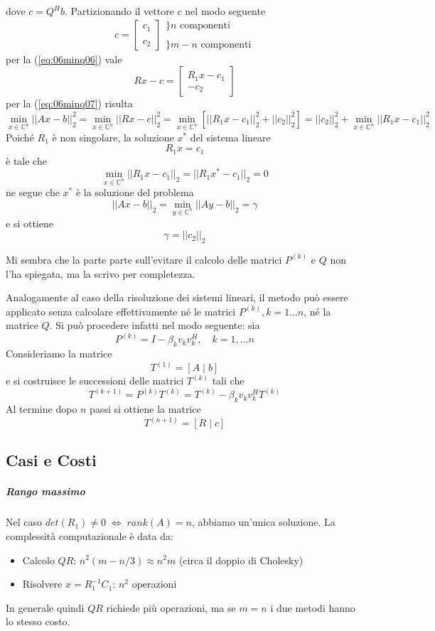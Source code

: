 dove $c = Q^H b$. Partizionando il vettore $c$ nel modo seguente
$$
  c = \left[
\begin{array}{l} c_1 \\ \\ c_2
\end{array} \right]
\begin{array}{l} \}n \text{ componenti} \\ \\ \}m-n \text{ componenti}
\end{array}
$$
per la (\ref{eq:06minq06}) vale
$$
Rx - c = \left[
\begin{array}{c} R_1 x -c_1 \\ -c_2
\end{array} \right]
$$
per la (\ref{eq:06minq07}) risulta
$$\min_{x \in \mathbb{C}^{n}}||Ax-b ||_{2}^{2}
= \min_{x \in \mathbb{C}^{n}}||Rx-c ||_{2}^{2} = \min_{x \in
\mathbb{C}^{n}}[||R_1x-c_1 ||_{2}^{2} + ||c_2||_2^2] = ||c_2||_2^2 +
\min_{x \in \mathbb{C}^{n}} ||R_1x - c_1 ||_{2}^{2}
 $$
Poich\'e $R_1$ \`e non singolare, la soluzione $x^{*}$ del sistema
lineare
\begin{equation}
 \label{eq:06minq08} R_1x = c_1
\end{equation} \`e tale che
$$
\min_{x \in \mathbb{C}^{n}} ||R_1 x - c_1||_2 = ||R_1 x^{*} -c_1||_2 =
0
$$
ne segue che $x^*$ \`e la soluzione del problema
$$|| Ax − b ||_{2} = \displaystyle \min_{y \in
\mathbb{C}^{n}} || Ay − b||_{2} = \gamma$$ e si ottiene
$$\gamma = ||c_2||_2$$

\begin{notes} Mi sembra che la parte parte sull'evitare il calcolo
delle matrici $P^{(k)}$ e $Q$ non l'ha spiegata, ma la scrivo per
completezza.
\end{notes} Analogamente al caso della risoluzione dei sistemi
lineari, il metodo pu\`o essere applicato senza calcolare
effettivamente n\'e le matrici $P^{(k)}, k =1\ldots n$, n\'e la
matrice $Q$.  Si pu\`o procedere infatti nel modo seguente: sia
$$P^{(k)} = I - \beta_{k} v_k v_k^{H}, \quad
k=1, \ldots n$$ Consideriamo la matrice
$$T^{(1)} = [A \; | \; b]$$
e si costruisce le successioni delle matrici $T^{(k)}$ tali che
$$
T^{(k+1)} = P^{(k)}T^{(k)} = T^{(k)} - \beta_k v_k v_k^{H} T^{(k)}
$$
Al termine dopo $n$ passi si ottiene la matrice
$$ T^{(n+1)} = [R \; | \; c ] $$

\subsection{Casi e Costi} \subparagraph{Rango massimo} Nel caso
$det(R_1) \neq 0 \; \Longleftrightarrow \; rank(A) =n$, abbiamo
un'unica soluzione. La complessit\`a computazionale \`e data da:
\begin{itemize}
 \item Calcolo $QR$: $n^{2}(m-n/3) \approx n^{2}m$ (circa il doppio di
Cholesky)
\item Risolvere $x = R_1^{-1} C_1$: $n^2$ operazioni
\end{itemize} In generale quindi $QR$ richiede pi\`u operazioni, ma se
$m=n$ i due metodi hanno lo stesso costo.

